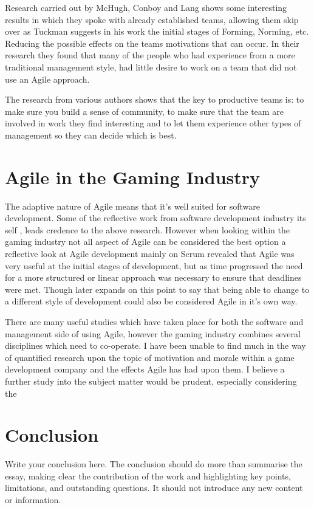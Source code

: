 \documentclass{scrartcl}
\begin{document}
Research carried out by McHugh, Conboy and Lang \cite {AgilePractices} shows some interesting results in which they spoke with already established teams, allowing them skip over as Tuckman \cite {Tuckman} suggests in his work the initial stages of Forming, Norming, etc. Reducing the possible effects on the teams motivations that can occur. In their research they found that many of the people who had experience from a more traditional management style, had little desire to work on a team that did not use an Agile approach.
 
The research from various authors shows that the key to productive teams is: to make sure you build a sense of community, to make sure that the team are involved in work they find interesting and to let them experience other types of management so they can decide which is best.

\section{Agile in the Gaming Industry}

The adaptive nature of Agile means that it's well suited for software development. Some of the reflective work from software development industry its self \cite{Practitioners}, leads credence to the above research. However when looking within the gaming industry not all aspect of Agile can be considered the best option \cite{RyseCrisis} a reflective look at Agile development mainly on Scrum revealed that Agile was very useful at the initial stages of development, but as time progressed the need for a more structured or linear approach was necessary to ensure that deadlines were met. Though later expands on this point to say that being able to change to a different style of development could also be considered Agile in it's own way. 

There are many useful studies which have taken place for both the software and management side of using Agile, however the gaming industry combines several disciplines which need to co-operate. I have been unable to find much in the way of quantified research upon the topic of motivation and morale within a game development company and the effects Agile has had upon them. I believe a further study into the subject matter would be prudent, especially considering the 



\section{Conclusion}

Write your conclusion here. The conclusion should do more than summarise the essay, making clear the contribution of the work and highlighting key points, limitations, and outstanding questions. It should not introduce any new content or information.



\end{document}
